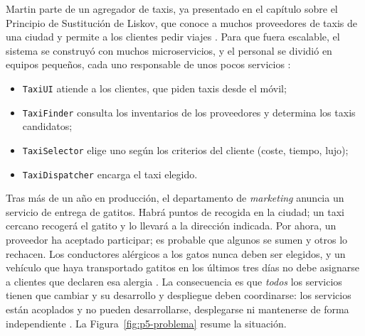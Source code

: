 Martin parte de un agregador de taxis, ya presentado en el capítulo sobre el Principio de
Sustitución de Liskov, que conoce a muchos proveedores de taxis de una ciudad y permite a
los clientes pedir viajes \parencite[80, 242]{martin2017}. Para que fuera escalable, el
sistema se construyó con muchos microservicios, y el personal se dividió en equipos
pequeños, cada uno responsable de unos pocos servicios \parencite[242]{martin2017}:
\begin{itemize}
  \item \texttt{TaxiUI} atiende a los clientes, que piden taxis desde el móvil;
  \item \texttt{TaxiFinder} consulta los inventarios de los proveedores y determina los
        taxis candidatos;
  \item \texttt{TaxiSelector} elige uno según los criterios del cliente (coste, tiempo,
        lujo);
  \item \texttt{TaxiDispatcher} encarga el taxi elegido.
\end{itemize}

Tras más de un año en producción, el departamento de \textit{marketing} anuncia un servicio
de entrega de gatitos. Habrá puntos de recogida en la ciudad; un taxi cercano recogerá el
gatito y lo llevará a la dirección indicada. Por ahora, un proveedor ha aceptado
participar; es probable que algunos se sumen y otros lo rechacen. Los conductores
alérgicos a los gatos nunca deben ser elegidos, y un vehículo que haya transportado
gatitos en los últimos tres días no debe asignarse a clientes que declaren esa alergia
\parencite[243]{martin2017}. La consecuencia es que \emph{todos} los servicios tienen que
cambiar y su desarrollo y despliegue deben coordinarse: los servicios están acoplados y
no pueden desarrollarse, desplegarse ni mantenerse de forma independiente
\parencite[243]{martin2017}. La Figura~\ref{fig:p5-problema} resume la situación.

